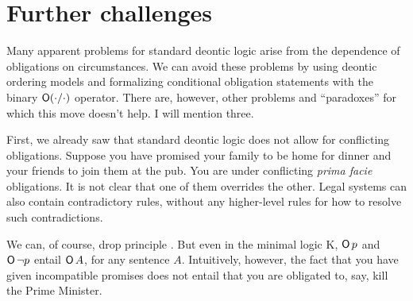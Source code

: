 



  
\section{Further challenges}

Many apparent problems for standard deontic logic arise from the dependence of
obligations on circumstances. We can avoid these problems by using deontic
ordering models and formalizing conditional obligation statements with the
binary $\operatorname{\mathsf{O}}(\cdot/\cdot)$ operator. There are, however, other problems and
``paradoxes'' for which this move doesn't help. I will mention three.

First, we already saw that standard deontic logic does not allow for conflicting
obligations. Suppose you have promised your family to be home for dinner and
your friends to join them at the pub. You are under conflicting \emph{prima
  facie} obligations. It is not clear that one of them overrides the other.
Legal systems can also contain contradictory rules, without any higher-level
rules for how to resolve such contradictions.

We can, of course, drop principle . But even in the minimal logic K,
$\operatorname{\mathsf{O}} p$ and $\operatorname{\mathsf{O}} \neg p$ entail $\operatorname{\mathsf{O}} A$, for any sentence $A$. Intuitively,
however, the fact that you have given incompatible promises does not entail that
you are obligated to, say, kill the Prime Minister.


